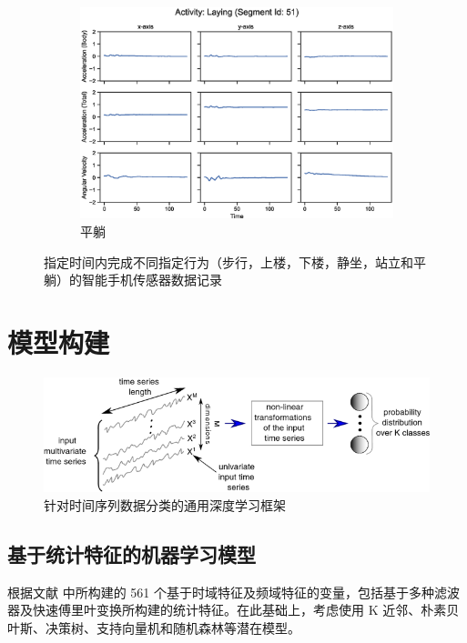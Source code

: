 \documentclass[screen,17pt,cn,founder,mtpro2]{elegantnote}
\begin{document}
\begin{figure}
\begin{subfigure}{.33\textwidth}
        \includegraphics[width=\linewidth]{images/activity-laying-segment-51.eps}
        \caption{平躺}
    \end{subfigure}
    \caption{指定时间内完成不同指定行为（步行，上楼，下楼，静坐，站立和平躺）的智能手机传感器数据记录}
\end{figure}
\clearpage

\section{模型构建}

\begin{figure}[hpt]
    \centering
    \includegraphics[width=.9\linewidth]{images/general-deep-learning-for-time-series-classification.png}
    \caption{针对时间序列数据分类的通用深度学习框架\citep{ismail_fawaz_deep_2019}}
\end{figure}

\subsection{基于统计特征的机器学习模型}

根据文献 \cite{anguita_human_2012} 中所构建的 561 个基于时域特征及频域特征的变量，包括基于多种滤波器及快速傅里叶变换所构建的统计特征。在此基础上，考虑使用 K 近邻、朴素贝叶斯、决策树、支持向量机和随机森林等潜在模型。
\clearpage
\end{document}

